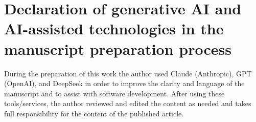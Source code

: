 \documentclass{ifacconf}
\begin{document}
\section*{Declaration of generative AI and AI-assisted technologies in the manuscript preparation process}

During the preparation of this work the author used Claude (Anthropic), GPT
(OpenAI), and DeepSeek in order to improve the clarity and language of the
manuscript and to assist with software development.  After using these
tools/services, the author reviewed and edited the content as needed and takes
full responsibility for the content of the published article.



\end{document}
